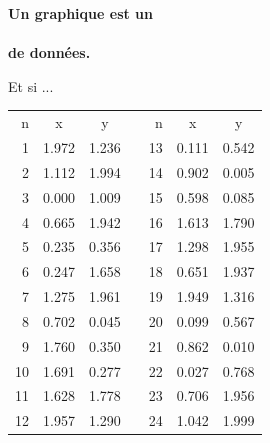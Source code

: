 \documentclass[french]{beamer}
\newcommand\red[1]{{\color{ulred}{\textbf{#1}}}}
\begin{document}
 \begin{frame}{}
\begin{center}\begin{Huge}\textbf{
	Un graphique est un\\ \red{encodage}\\ de données.
}\end{Huge}\end{center}
\end{frame}

 \begin{frame}{Et si ...}
\begin{center}
	\begin{tabular}{r|cc|cr|cc|}
		n&x & y  &  & n& x & y \\ 
		1&1.972&1.236&& 13&0.111&0.542 \\
		2&1.112&1.994&& 14&0.902&0.005 \\
		3&0.000&1.009&& 15&0.598&0.085 \\
		4&0.665&1.942&& 16&1.613&1.790 \\
		5&0.235&0.356&& 17&1.298&1.955 \\
		6&0.247&1.658&& 18&0.651&1.937 \\
		7&1.275&1.961&& 19&1.949&1.316 \\
		8&0.702&0.045&& 20&0.099&0.567 \\
		9&1.760&0.350&& 21&0.862&0.010 \\
		10&1.691&0.277&& 22&0.027&0.768 \\
		11&1.628&1.778&& 23&0.706&1.956 \\
		12&1.957&1.290&& 24&1.042&1.999 \\
	\end{tabular} 
\end{center}
\end{frame}
\end{document}
